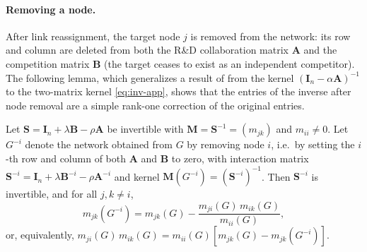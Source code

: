 \paragraph{Removing a node.}
After link reassignment, the target node $j$ is removed from the
network: its row and column are deleted from both the R\&D
collaboration matrix $\mathbf{A}$ and the competition matrix
$\mathbf{B}$ (the target ceases to exist as an independent competitor).
The following lemma, which generalizes a result of
\citet{ballester06:_who_networ} from the kernel $(\mathbf{I}_n - \alpha
\mathbf{A})^{-1}$ to the two-matrix kernel
\eqref{eq:inv-app}, shows that the entries of the inverse after node
removal are a simple rank-one correction of the original entries.

\begin{lemma}
Let $\mathbf{S} = \mathbf{I}_n + \lambda \mathbf{B} - \rho \mathbf{A}$
be invertible with $\mathbf{M} = \mathbf{S}^{-1} = (m_{jk})$ and
$m_{ii} \neq 0$. Let $G^{-i}$ denote the network obtained from $G$ by
removing node $i$, i.e.\ by setting the $i$-th row and column of both
$\mathbf{A}$ and $\mathbf{B}$ to zero, with interaction matrix
$\mathbf{S}^{-i} = \mathbf{I}_n + \lambda \mathbf{B}^{-i} - \rho
\mathbf{A}^{-i}$ and kernel $\mathbf{M}(G^{-i}) = (\mathbf{S}^{-i})^{-1}$.
Then $\mathbf{S}^{-i}$ is invertible, and for all $j, k \neq i$,
\begin{equation}
m_{jk}(G^{-i})
=
m_{jk}(G)
-
\frac{m_{ji}(G)\, m_{ik}(G)}{m_{ii}(G)},
\label{eq:matrix-perturbation-mna}
\end{equation}
or, equivalently,
$m_{ji}(G)\, m_{ik}(G) = m_{ii}(G) \left[ m_{jk}(G) -
m_{jk}(G^{-i}) \right]$.
\label{lem:matrix-perturbation-mna}
\label{cor:matrix-perturbation-mna}
\end{lemma}

